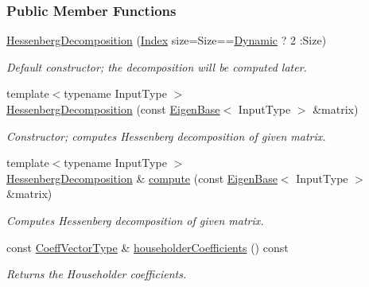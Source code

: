 \subsubsection*{Public Member Functions}
\begin{DoxyCompactItemize}
\item 
\hyperlink{group___eigenvalues___module_aee1724cb6418ede1a8b9045036a5a319}{Hessenberg\+Decomposition} (\hyperlink{group___eigenvalues___module_a8e287ac222f53e2c8ce82faa43e95ac6}{Index} size=Size==\hyperlink{namespace_eigen_ad81fa7195215a0ce30017dfac309f0b2}{Dynamic} ? 2 \+:Size)
\begin{DoxyCompactList}\small\item\em Default constructor; the decomposition will be computed later. \end{DoxyCompactList}\item 
{\footnotesize template$<$typename Input\+Type $>$ }\\\hyperlink{group___eigenvalues___module_acd22602a3e3e5a02f79990ba1e445dc9}{Hessenberg\+Decomposition} (const \hyperlink{group___core___module_struct_eigen_1_1_eigen_base}{Eigen\+Base}$<$ Input\+Type $>$ \&matrix)
\begin{DoxyCompactList}\small\item\em Constructor; computes Hessenberg decomposition of given matrix. \end{DoxyCompactList}\item 
{\footnotesize template$<$typename Input\+Type $>$ }\\\hyperlink{group___eigenvalues___module_class_eigen_1_1_hessenberg_decomposition}{Hessenberg\+Decomposition} \& \hyperlink{group___eigenvalues___module_a239a6fd42c57aab3c0b048c47fde3004}{compute} (const \hyperlink{group___core___module_struct_eigen_1_1_eigen_base}{Eigen\+Base}$<$ Input\+Type $>$ \&matrix)
\begin{DoxyCompactList}\small\item\em Computes Hessenberg decomposition of given matrix. \end{DoxyCompactList}\item 
const \hyperlink{group___eigenvalues___module_a567f99f3770365777b67bf9832b6fac1}{Coeff\+Vector\+Type} \& \hyperlink{group___eigenvalues___module_a65fa81ce79d956baa59a30a6d82f8a84}{householder\+Coefficients} () const
\begin{DoxyCompactList}\small\item\em Returns the Householder coefficients. \end{DoxyCompactList}\item 

\end{DoxyCompactItemize}
